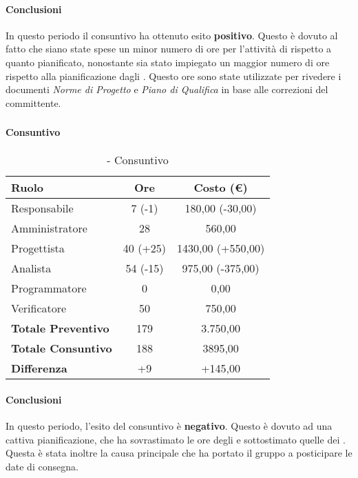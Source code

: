 \documentclass[./PianoDiProgetto.tex]{subfiles}
\begin{document}
	\paragraph{Conclusioni}
	In questo periodo il consuntivo ha ottenuto esito \textbf{positivo}. Questo è dovuto al fatto che siano state spese un minor numero di ore  per l'attività di  rispetto a quanto pianificato, nonostante sia stato impiegato un maggior numero di ore rispetto alla pianificazione dagli \AMMP{}. Questo ore sono state utilizzate per rivedere i documenti \textit{Norme di Progetto} e \textit{Piano di Qualifica} in base alle correzioni del committente.
	
\subsubsection{\PerPA}
\paragraph{Consuntivo}
	\begin{table}[h]
		\centering
		\begin{tabular}{l * {2}{c}}
			\toprule
			\textbf{Ruolo} & \textbf{Ore} & \textbf{Costo (\euro{})} \\
			\midrule
			Responsabile &	7 (-1) & 180,00 (-30,00) \\
			Amministratore & 28 & 560,00\\
			Progettista & 40 (+25) & 1430,00 (+550,00)\\
			Analista & 54 (-15)  & 975,00 (-375,00)\\
			Programmatore & 0 & 0,00 \\
			Verificatore & 50 & 750,00\\
			\midrule
			\textbf{Totale Preventivo} & 179
 & 3.750,00
 \\		
			\textbf{Totale Consuntivo} & 188 & 3895,00
 \\
			\midrule
			\textbf{Differenza} & +9 & +145,00 \\
			\bottomrule
		\end{tabular}
		\caption{\PerPA{} - Consuntivo}
	\end{table}	
	\paragraph{Conclusioni}
			In questo periodo, l'esito del consuntivo è \textbf{negativo}. Questo è dovuto ad una cattiva pianificazione, che ha sovrastimato le ore degli \ANP{} e sottostimato quelle dei \PJP{}. Questa è stata inoltre la causa principale che ha portato il gruppo a posticipare le date di consegna.
	\clearpage
\end{document}
